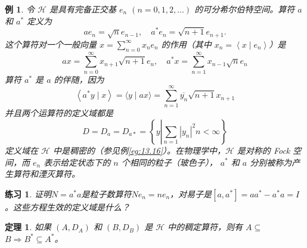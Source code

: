 \documentclass[hyperref,UTF8]{ctexbook}
\newtheorem{eg}{例}[chapter]
\newtheorem{theorem}{定理}[chapter]
\newtheorem*{exercise}{练习}
\begin{document}
\begin{eg}
    令 \(\mathcal{H}\) 是具有完备正交基 \(e_{n}\) \((n=0,1,2, \ldots)\) 的可分希尔伯特空间。算符 \(a\) 和 \(a^{*}\) 定义为
\[
a e_{n}=\sqrt{n} e_{n-1}, \quad a^{*} e_{n}=\sqrt{n+1} e_{n+1} .
\]
这个算符对一个一般向量 \(x=\sum_{n=0}^{\infty} x_{n} e_{n}\) 的作用（其中 \(x_{n}=\left\langle x \mid e_{ n}\right\rangle\)）是
\[
a x=\sum_{n=0}^{\infty} x_{n+1} \sqrt{n+1} e_{n}, \quad a^{*} x=\sum_{n=1}^{\infty} x_{n-1} \sqrt{n} e_{n}
\]
算符 \(a^{*}\) 是 \(a\) 的伴随，因为
\[
\left\langle a^{*} y \mid x\right\rangle=\langle y \mid a x\rangle=\sum_{n=1}^{\infty} \overline{y_{n}} \sqrt{n+1} x_{n+1}
\]
并且两个运算符的定义域都是
\[
D=D_{a}=D_{a *}=\left\{y\left|\sum_{n=1}\right.\left| y_{n}\right|^{2}n<\infty\right\}
\]
定义域在 \(\mathcal{H}\) 中是稠密的（参见例\ref{eg:13.16}）。在物理学中，\(\mathcal{H}\) 是对称的 Fock 空间，而 \(e_{n}\) 表示给定状态下的 \(n\) 个相同的粒子（玻色子）， \(a^{ *}\) 和 \(a\) 分别被称为产生算符和湮灭算符。
\end{eg}
\begin{exercise}
    证明\(N=a^{*} a\)是粒子数算符\(N e_{n}=n e_{n}\)，对易子是\(\left[a, a^{ *}\right]=a a^{*}-a^{*} a=I\)。这些方程生效的定义域是什么？
\end{exercise}
\begin{theorem}
    如果 \(\left(A, D_{A}\right)\) 和 \(\left(B, D_{B}\right)\) 是 \(\mathcal{H}\) 中的稠定算符，则有 \(A \subseteq\) \(B \Longrightarrow B^{*} \subseteq A^{*}\)。
\end{theorem}
\end{document}
